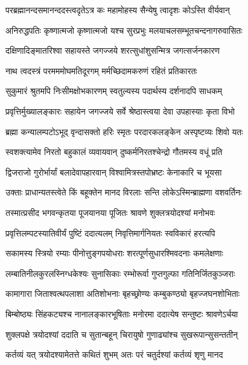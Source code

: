 \twolineshloka
{परब्रह्मानन्दसमानन्ददस्त्वदृतेऽत्र कः}
{महामोहस्य सैन्येषु त्वादृशः कोऽस्ति वीर्यवान्} %

\twolineshloka
{अनिरुद्धपतिः कृष्णात्मजो कृष्णात्मजो यश्च सुरप्रभुः}
{मलयाचलसम्भूतचन्दनागरुवासितः} %

\twolineshloka
{दक्षिणादिङ्मातरिश्वा सहायस्ते जगज्जये}
{शरत्सुधांशुसन्मित्र जगत्सर्जनकारण} %

\twolineshloka
{नाथ त्वदस्त्रं परमममोघमतिदूरगम्}
{मर्मच्छिदामकरुणं रहितं प्रतिकारतः} %

\twolineshloka
{सुकुमारं श्रुतमपि निःसीमक्षोभकारणम्}
{स्वतुल्यस्य पदार्थस्य दर्शनादपि साधकम्} %

\twolineshloka
{प्रवृत्तिर्मुख्यालङ्कारः सहायेन जगज्जये}
{सर्वे श्रेष्ठास्त्वया देवा उपहास्याः कृता विभो} %

\twolineshloka
{ब्रह्मा कन्यालम्पटोऽभूद् वृन्दासक्तो हरिः स्मृतः}
{परदारकलङ्केन अस्पृष्टव्यः शिवो यतः} %

\twolineshloka
{स्वशक्त्यामेव निरतो बहुकालं व्यवायवान्}
{दुष्कर्मनिरतश्चेन्द्रो गौतमस्य वधूं प्रति} %

\twolineshloka
{द्विजराजो गुरोर्भार्यां बलादेवापहारवान्}
{विश्वामित्रस्तपोभ्रष्टः केनाकारि च भूयसा} %

\twolineshloka
{उक्ताः प्राधान्यतस्त्वेते किं बहूक्तेन मानद}
{विरलाः सन्ति लोकेऽस्मिन्ब्राह्मणा वशवर्तिनः} %

\twolineshloka
{तस्मात्प्रसीद भगवन्कृतया पूजयानया}
{पूजितः श्रावणे शुक्लत्रयोदश्यां मनोभवः} %

\twolineshloka
{प्रवृत्तिलम्पटस्यातिवीर्यं पुष्टिं ददात्यलम्}
{निवृत्तिमार्गनियतः स्वविकारं हरत्यपि} %

\twolineshloka
{सकामस्य स्त्रियो रम्याः पीनोत्तुङ्गपयोधराः}
{शरत्पूर्णसुधारश्मिवदनाः कमलेक्षणाः} %

\twolineshloka
{लम्बातिनीलकुरलस्निग्धकेश्यः सुनासिकाः}
{रम्भोरूर्वा गुप्तगुल्फा गतिनिर्जितकुञ्जराः} %

\twolineshloka
{कामागारा जिताश्वत्थपलाशा अतिशोभनाः}
{बृहच्छ्रोण्यः कम्बुकण्ठ्यो बृहज्जघनशोभिताः} %

\twolineshloka
{बिम्बोष्ठ्यः सिंहकट्यश्च नानालङ्कारभूषिताः}
{मनोरमा ददात्येष सन्तुष्टः श्रावणेऽर्चया} %

\twolineshloka
{शुक्लपक्षे त्रयोदश्यां ददाति च सुतान्बहून्}
{चिरायुषो गुणाढ्यांश्च सुखरूपान्सुसन्ततीन्} %

\twolineshloka
{कर्तव्यं यत् त्रयोदश्यामेतत्ते कथितं शुभम्}
{अतः परं चतुर्दश्यां कर्तव्यं शृणु मानद} %

